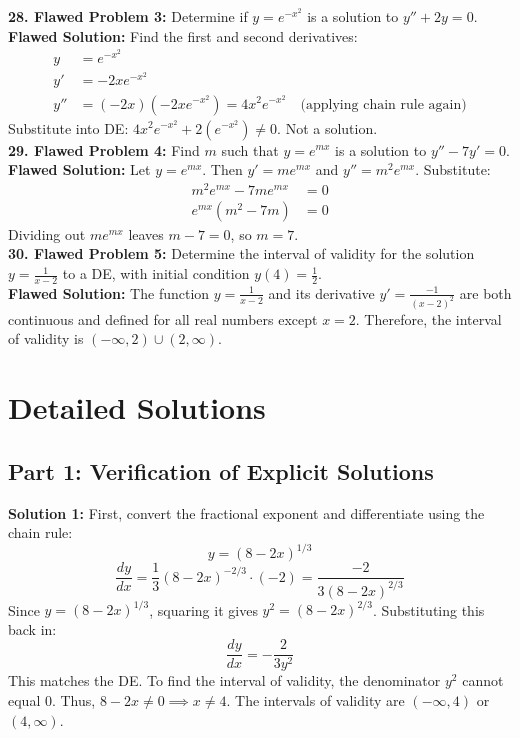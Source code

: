 \documentclass[12pt]{article}
\begin{document}
\noindent \textbf{28. Flawed Problem 3:} Determine if $y = e^{-x^2}$ is a solution to $y'' + 2y = 0$. \\
\textbf{Flawed Solution:} Find the first and second derivatives:
\begin{align*}
y &= e^{-x^2} \\
y' &= -2x e^{-x^2} \\
y'' &= (-2x)(-2x e^{-x^2}) = 4x^2 e^{-x^2} \quad \text{(applying chain rule again)}
\end{align*}
Substitute into DE: $4x^2 e^{-x^2} + 2(e^{-x^2}) \neq 0$. Not a solution. \\

\noindent \textbf{29. Flawed Problem 4:} Find $m$ such that $y = e^{mx}$ is a solution to $y'' - 7y' = 0$. \\
\textbf{Flawed Solution:} Let $y = e^{mx}$. Then $y' = m e^{mx}$ and $y'' = m^2 e^{mx}$. Substitute:
\begin{align*}
m^2 e^{mx} - 7m e^{mx} &= 0 \\
e^{mx}(m^2 - 7m) &= 0
\end{align*}
Dividing out $m e^{mx}$ leaves $m - 7 = 0$, so $m = 7$. \\

\noindent \textbf{30. Flawed Problem 5:} Determine the interval of validity for the solution $y = \frac{1}{x-2}$ to a DE, with initial condition $y(4) = \frac{1}{2}$. \\
\textbf{Flawed Solution:} The function $y = \frac{1}{x-2}$ and its derivative $y' = \frac{-1}{(x-2)^2}$ are both continuous and defined for all real numbers except $x = 2$. Therefore, the interval of validity is $(-\infty, 2) \cup (2, \infty)$.

\newpage

\section{Detailed Solutions}

\subsection*{Part 1: Verification of Explicit Solutions}
\textbf{Solution 1:} First, convert the fractional exponent and differentiate using the chain rule:
$$y = (8-2x)^{1/3}$$
$$\frac{dy}{dx} = \frac{1}{3}(8-2x)^{-2/3} \cdot (-2) = \frac{-2}{3(8-2x)^{2/3}}$$
Since $y = (8-2x)^{1/3}$, squaring it gives $y^2 = (8-2x)^{2/3}$. Substituting this back in:
$$\frac{dy}{dx} = -\frac{2}{3y^2}$$
This matches the DE. To find the interval of validity, the denominator $y^2$ cannot equal $0$. Thus, $8-2x \neq 0 \implies x \neq 4$. The intervals of validity are $(-\infty, 4)$ or $(4, \infty)$. \\
\end{document}

